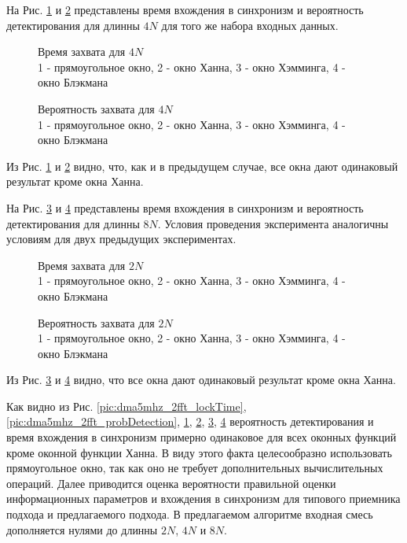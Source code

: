 На Рис. \ref{pic:dma5mhz_4fft_lockTime} и \ref{pic:dma5mhz_4fft_probDetection} представлены время вхождения в синхронизм и вероятность детектирования для длинны ${4N}$
для того же набора входных данных.
\begin{figure}[h]
\center{}
	\caption{Время захвата для ${4N}$ \\ 1 - прямоугольное окно, 2 - окно Ханна, 3 - окно Хэмминга, 4 - окно Блэкмана}
	\label{pic:dma5mhz_4fft_lockTime}
\end{figure}
\begin{figure}[h]
\center{}
	\caption{Вероятность захвата для ${4N}$ \\ 1 - прямоугольное окно, 2 - окно Ханна, 3 - окно Хэмминга, 4 - окно Блэкмана}
	\label{pic:dma5mhz_4fft_probDetection}
\end{figure}
Из Рис. \ref{pic:dma5mhz_4fft_lockTime} и \ref{pic:dma5mhz_4fft_probDetection} видно, что, как и в предыдущем случае, все окна дают одинаковый результат кроме окна Ханна.

На Рис. \ref{pic:dma5mhz_8fft_lockTime} и \ref{pic:dma5mhz_8fft_probDetection} представлены время вхождения в синхронизм и вероятность детектирования для длинны ${8N}$. Условия
проведения эксперимента аналогичны условиям для двух предыдущих экспериментах.
\begin{figure}[h]
\center{}
	\caption{Время захвата для ${2N}$ \\ 1 - прямоугольное окно, 2 - окно Ханна, 3 - окно Хэмминга, 4 - окно Блэкмана}
	\label{pic:dma5mhz_8fft_lockTime}
\end{figure}
\begin{figure}[h]
\center{}
	\caption{Вероятность захвата для ${2N}$ \\ 1 - прямоугольное окно, 2 - окно Ханна, 3 - окно Хэмминга, 4 - окно Блэкмана}
	\label{pic:dma5mhz_8fft_probDetection}
\end{figure}
Из Рис. \ref{pic:dma5mhz_8fft_lockTime} и \ref{pic:dma5mhz_8fft_probDetection} видно, что все окна дают одинаковый результат кроме окна Ханна.

Как видно из Рис. \ref{pic:dma5mhz_2fft_lockTime}, \ref{pic:dma5mhz_2fft_probDetection}, \ref{pic:dma5mhz_4fft_lockTime}, \ref{pic:dma5mhz_4fft_probDetection},
\ref{pic:dma5mhz_8fft_lockTime}, \ref{pic:dma5mhz_8fft_probDetection} вероятность детектирования и время вхождения в синхронизм примерно одинаковое для всех оконных функций
кроме оконной функции Ханна. В виду этого факта целесообразно использовать прямоугольное окно, так как оно не требует дополнительных вычислительных операций.
Далее приводится оценка вероятности правильной оценки информационных параметров и вхождения в синхронизм для типового приемника подхода и предлагаемого подхода.
В предлагаемом алгоритме входная смесь дополняется нулями до длинны ${2N}$, ${4N}$ и ${8N}$.

